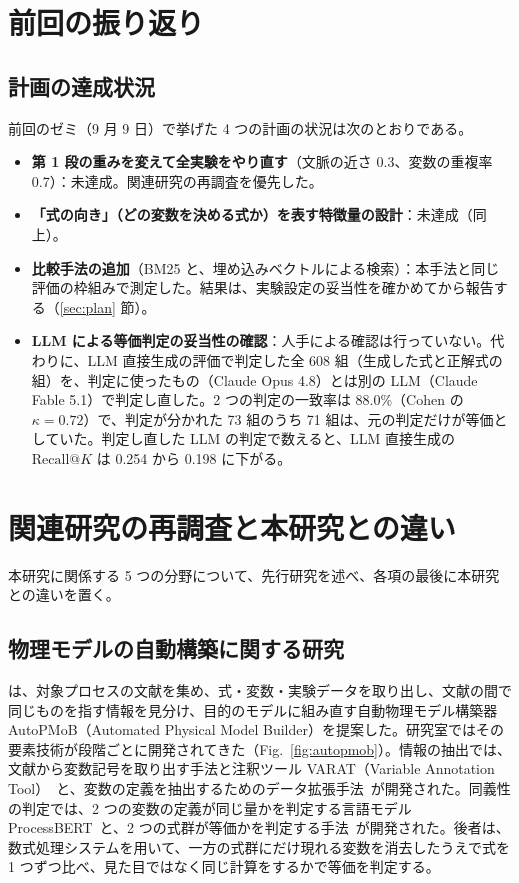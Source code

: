\documentclass[a4j,dvipdfmx,10pt]{jresume}
\makeatletter
\newcommand{\rk}{\textrm{Recall@}K}
\makeatother
\begin{document}
\section{前回の振り返り}\label{sec:review}
\subsection{計画の達成状況}
前回のゼミ（9 月 9 日）で挙げた 4 つの計画の状況は次のとおりである。
\begin{itemize}[leftmargin=1.5em]
  \item \textbf{第 1 段の重みを変えて全実験をやり直す}（文脈の近さ 0.3、変数の重複率 0.7）：未達成。関連研究の再調査を優先した。
  \item \textbf{「式の向き」（どの変数を決める式か）を表す特徴量の設計}：未達成（同上）。
  \item \textbf{比較手法の追加}（BM25 と、埋め込みベクトルによる検索）：本手法と同じ評価の枠組みで測定した。結果は、実験設定の妥当性を確かめてから報告する（\ref{sec:plan} 節）。
  \item \textbf{LLM による等価判定の妥当性の確認}：人手による確認は行っていない。代わりに、LLM 直接生成の評価で判定した全 608 組（生成した式と正解式の組）を、判定に使ったもの（Claude Opus 4.8）とは別の LLM（Claude Fable 5.1）で判定し直した。2 つの判定の一致率は 88.0\%（Cohen の $\kappa = 0.72$）で、判定が分かれた 73 組のうち 71 組は、元の判定だけが等価としていた。判定し直した LLM の判定で数えると、LLM 直接生成の $\rk$ は 0.254 から 0.198 に下がる。
\end{itemize}


\section{関連研究の再調査と本研究との違い}\label{sec:body}
本研究に関係する 5 つの分野について、先行研究を述べ、各項の最後に本研究との違いを置く。

\subsection{物理モデルの自動構築に関する研究}\label{sec:pmb}
\citet{KatoCSTR,KatoProto}は、対象プロセスの文献を集め、式・変数・実験データを取り出し、文献の間で同じものを指す情報を見分け、目的のモデルに組み直す自動物理モデル構築器 AutoPMoB（Automated Physical Model Builder）を提案した。研究室ではその要素技術が段階ごとに開発されてきた（Fig.~\ref{fig:autopmob}）。情報の抽出では、文献から変数記号を取り出す手法と注釈ツール VARAT（Variable Annotation Tool）~\citep{VARAT}と、変数の定義を抽出するためのデータ拡張手法~\citep{Nagayama}が開発された。同義性の判定では、2 つの変数の定義が同じ量かを判定する言語モデル ProcessBERT~\citep{ProcessBERT}と、2 つの式群が等価かを判定する手法~\citep{ZhangEquiv,DAEEquiv}が開発された。後者は、数式処理システムを用いて、一方の式群にだけ現れる変数を消去したうえで式を 1 つずつ比べ、見た目ではなく同じ計算をするかで等価を判定する。
\end{document}
